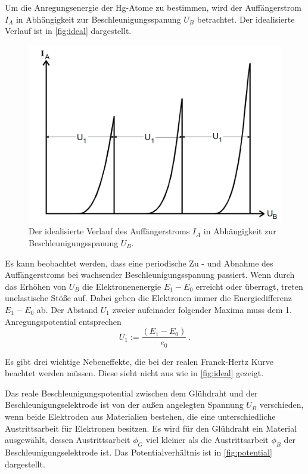 Um die Anregungsenergie der Hg-Atome zu bestimmen, wird der Auffängerstrom $I_A$ in Abhängigkeit zur Beschleunigungsspanung $U_B$
betrachtet. Der idealisierte Verlauf ist in \autoref{fig:ideal} dargestellt.

\begin{figure}[H]
	\centering
	\includegraphics[width=0.75\linewidth]{content/grafik/idealisiert.png}
	\caption{Der idealisierte Verlauf des Auffängerstroms $I_A$ in Abhängigkeit zur Beschleunigungsspanung $U_B$. \cite{franck}}
	\label{fig:ideal}
\end{figure}

Es kann beobachtet werden, dass eine periodische Zu - und Abnahme des Auffängerstroms bei wachsender Beschleunigungsspanung
passiert. Wenn durch das Erhöhen von $U_B$ die Elektronenenergie $E_1 - E_0$ erreicht oder überragt, treten unelastische Stöße auf.
Dabei geben die Elektronen immer die Energiedifferenz $E_1 - E_0$ ab.
Der Abstand $U_1$ zweier aufeinader folgender Maxima muss dem 1. Anregungspotential entsprechen
\begin{equation}
    U_1:=\frac{\left(E_1-E_0\right)}{e_0} \: .
    \label{eqn:u1}
\end{equation}

Es gibt drei wichtige Nebeneffekte, die bei der realen Franck-Hertz Kurve beachtet werden müssen. Diese sieht
nicht aus wie in \autoref{fig:ideal} gezeigt.

Das reale Beschleunigungspotential zwischen dem Glühdraht und der Beschleunigungselektrode ist von der außen
angelegten Spannung $U_B$ verschieden, wenn beide Elektroden aus Materialien bestehen, die eine unterschiedliche
Austrittsarbeit für Elektronen besitzen. Es wird für den Glühdraht ein Material ausgewählt, dessen Austrittsarbeit  $\phi_G$
viel kleiner als die Austrittsarbeit $\phi_B$ der Beschleunigungselektrode ist. Das Potentialverhältnis ist
in \autoref{fig:potential} dargestellt.

